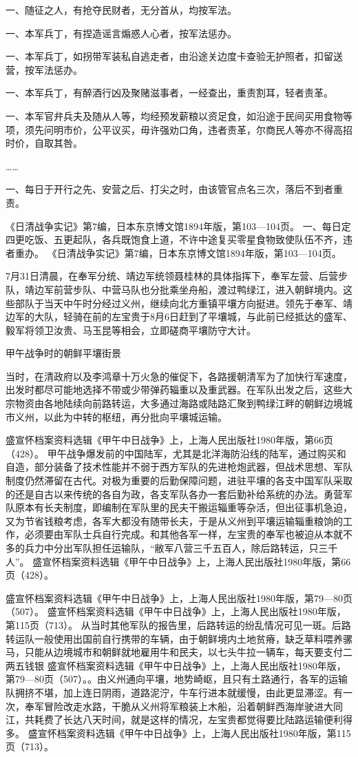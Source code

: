 \documentclass[12pt,UTF8]{ctexbook}
\begin{document}
一、随征之人，有抢夺民财者，无分首从，均按军法。

一、本军兵丁，有捏造谣言煽惑人心者，按军法惩办。

一、本军兵丁，如拐带军装私自逃走者，由沿途关边度卡查验无护照者，扣留送营，按军法惩办。

一、本军兵丁，有醉酒行凶及聚赌滋事者，一经查出，重责割耳，轻者责革。

一、本军官弁兵夫及随从人等，均经预发薪粮以资足食，如沿途于民间买用食物等项，须先问明市价，公平议买，毋许强劝口角，违者责革，尔商民人等亦不得高招时价，自取其咎。

……

一、每日于开行之先、安营之后、打尖之时，由该管官点名三次，落后不到者重责。

《日清战争实记》第7编，日本东京博文馆1894年版，第103—104页。
一、每日定四更吃饭、五更起队，各兵既饱食上道，不许中途复买零星食物致使队伍不齐，违者重办。 《日清战争实记》第7编，日本东京博文馆1894年版，第103—104页。

7月31日清晨，在奉军分统、靖边军统领聂桂林的具体指挥下，奉军左营、后营步队，靖边军前营步队、中营马队也分批乘坐舟船，渡过鸭绿江，进入朝鲜境内。这些部队于当天中午时分经过义州，继续向北方重镇平壤方向挺进。领先于奉军、靖边军的大队，轻骑在前的左宝贵于8月6日赶到了平壤城，与此前已经抵达的盛军、毅军将领卫汝贵、马玉昆等相会，立即磋商平壤防守大计。


甲午战争时的朝鲜平壤街景

当时，在清政府以及李鸿章十万火急的催促下，各路援朝清军为了加快行军速度，出发时都尽可能地选择不带或少带弹药辎重以及重武器。在军队出发之后，这些大宗物资由各地陆续向前路转运，大多通过海路或陆路汇聚到鸭绿江畔的朝鲜边境城市义州，以此为中转的枢纽，再分批向平壤城运输。

盛宣怀档案资料选辑《甲午中日战争》上，上海人民出版社1980年版，第66页（428）。
甲午战争爆发前的中国陆军，尤其是北洋海防沿线的陆军，通过购买和自造，部分装备了技术性能并不弱于西方军队的先进枪炮武器，但战术思想、军队制度仍然滞留在古代。对极为重要的后勤保障问题，进驻平壤的各支中国军队采取的还是自古以来传统的各自为政，各支军队各办一套后勤补给系统的办法。勇营军队原本有长夫制度，即编制在军队里的民夫干搬运辎重等杂活，但出征事机急迫，又为节省钱粮考虑，各军大都没有随带长夫，于是从义州到平壤运输辎重粮饷的工作，必须要由军队士兵自行完成。和其他各军一样，左宝贵的奉军也被迫从本就不多的兵力中分出军队担任运输队，“敝军八营三千五百人，除后路转运，只三千人”。 盛宣怀档案资料选辑《甲午中日战争》上，上海人民出版社1980年版，第66页（428）。

盛宣怀档案资料选辑《甲午中日战争》上，上海人民出版社1980年版，第79—80页（507）。
盛宣怀档案资料选辑《甲午中日战争》上，上海人民出版社1980年版，第115页（713）。
从当时其他军队的报告里，后路转运的纷乱情况可见一斑。后路转运队一般使用出国前自行携带的车辆，由于朝鲜境内土地贫瘠，缺乏草料喂养骡马，只能从边境城市和朝鲜就地雇用牛和民夫，以七头牛拉一辆车，每天要支付二两五钱银 盛宣怀档案资料选辑《甲午中日战争》上，上海人民出版社1980年版，第79—80页（507）。。由义州通向平壤，地势崎岖，且只有土路通行，各军的运输队拥挤不堪，加上连日阴雨，道路泥泞，牛车行进本就缓慢，由此更显滞涩。有一次，奉军冒险改走水路，干脆从义州将军粮装上木船，沿着朝鲜西海岸驶进大同江，共耗费了长达八天时间，就是这样的情况，左宝贵都觉得要比陆路运输便利得多。 盛宣怀档案资料选辑《甲午中日战争》上，上海人民出版社1980年版，第115页（713）。
\end{document}
